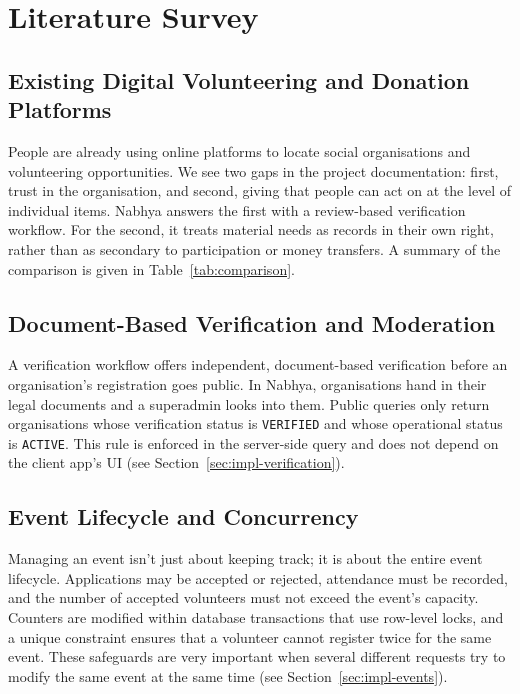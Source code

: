 \chapter{Literature Survey}
\label{ch:literature}

\section{Existing Digital Volunteering and Donation Platforms}
People are already using online platforms to locate social organisations and volunteering opportunities. We see two gaps in the project documentation: first, trust in the organisation, and second, giving that people can act on at the level of individual items. Nabhya answers the first with a review-based verification workflow. For the second, it treats material needs as records in their own right, rather than as secondary to participation or money transfers. A summary of the comparison is given in Table~\ref{tab:comparison}.

\section{Document-Based Verification and Moderation}
A verification workflow offers independent, document-based verification before an organisation's registration goes public. In Nabhya, organisations hand in their legal documents and a superadmin looks into them. Public queries only return organisations whose verification status is \texttt{VERIFIED} and whose operational status is \texttt{ACTIVE}. This rule is enforced in the server-side query and does not depend on the client app's UI (see Section~\ref{sec:impl-verification}).

\section{Event Lifecycle and Concurrency}
Managing an event isn't just about keeping track; it is about the entire event lifecycle. Applications may be accepted or rejected, attendance must be recorded, and the number of accepted volunteers must not exceed the event's capacity. Counters are modified within database transactions that use row-level locks, and a unique constraint ensures that a volunteer cannot register twice for the same event. These safeguards are very important when several different requests try to modify the same event at the same time (see Section~\ref{sec:impl-events}).

